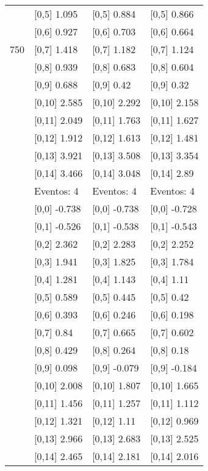 \begin{table}
\begin{tabular}[t]{llll}
 & {}[0,5] 1.095 & {}[0,5] 0.884 & {}[0,5] 0.866\\
 & {}[0,6] 0.927 & {}[0,6] 0.703 & {}[0,6] 0.664\\
750 & {}[0,7] 1.418 & {}[0,7] 1.182 & {}[0,7] 1.124\\
\addlinespace
 & {}[0,8] 0.939 & {}[0,8] 0.683 & {}[0,8] 0.604\\
 & {}[0,9] 0.688 & {}[0,9] 0.42 & {}[0,9] 0.32\\
 & {}[0,10] 2.585 & {}[0,10] 2.292 & {}[0,10] 2.158\\
 & {}[0,11] 2.049 & {}[0,11] 1.763 & {}[0,11] 1.627\\
 & {}[0,12] 1.912 & {}[0,12] 1.613 & {}[0,12] 1.481\\
\addlinespace
 & {}[0,13] 3.921 & {}[0,13] 3.508 & {}[0,13] 3.354\\
 & {}[0,14] 3.466 & {}[0,14] 3.048 & {}[0,14] 2.89\\
 & Eventos:  4 & Eventos:  4 & Eventos:  4\\
 & {}[0,0] -0.738 & {}[0,0] -0.738 & {}[0,0] -0.728\\
 & {}[0,1] -0.526 & {}[0,1] -0.538 & {}[0,1] -0.543\\
\addlinespace
 & {}[0,2] 2.362 & {}[0,2] 2.283 & {}[0,2] 2.252\\
 & {}[0,3] 1.941 & {}[0,3] 1.825 & {}[0,3] 1.784\\
 & {}[0,4] 1.281 & {}[0,4] 1.143 & {}[0,4] 1.11\\
 & {}[0,5] 0.589 & {}[0,5] 0.445 & {}[0,5] 0.42\\
 & {}[0,6] 0.393 & {}[0,6] 0.246 & {}[0,6] 0.198\\
\addlinespace
1000 & {}[0,7] 0.84 & {}[0,7] 0.665 & {}[0,7] 0.602\\
 & {}[0,8] 0.429 & {}[0,8] 0.264 & {}[0,8] 0.18\\
 & {}[0,9] 0.098 & {}[0,9] -0.079 & {}[0,9] -0.184\\
 & {}[0,10] 2.008 & {}[0,10] 1.807 & {}[0,10] 1.665\\
 & {}[0,11] 1.456 & {}[0,11] 1.257 & {}[0,11] 1.112\\
\addlinespace
 & {}[0,12] 1.321 & {}[0,12] 1.11 & {}[0,12] 0.969\\
 & {}[0,13] 2.966 & {}[0,13] 2.683 & {}[0,13] 2.525\\
 & {}[0,14] 2.465 & {}[0,14] 2.181 & {}[0,14] 2.016\\
\bottomrule
\end{tabular}
\end{table}
